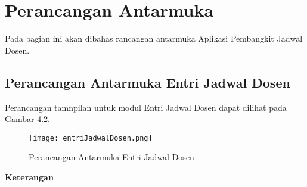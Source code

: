 \section{Perancangan Antarmuka}
Pada bagian ini akan dibahas rancangan antarmuka Aplikasi Pembangkit Jadwal Dosen.

\subsection{Perancangan Antarmuka Entri Jadwal Dosen}
Perancangan tamnpilan untuk modul Entri Jadwal Dosen dapat dilihat pada Gambar 4.2.
\begin{figure} [H]
	\centering  
	\texttt{[image: entriJadwalDosen.png]}
	\caption[Perancangan Antarmuka Entri Jadwal Dosen]{Perancangan Antarmuka Entri Jadwal Dosen} 
	\label{fig:flow-chart-CodeIgniter} 
\end{figure}
\textbf{Keterangan}
